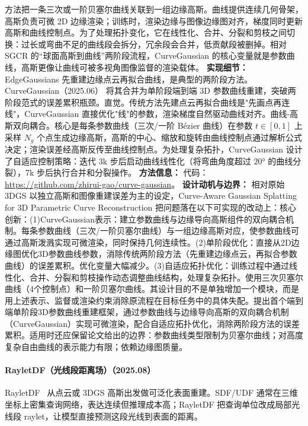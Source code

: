方法把一条三次或一阶贝塞尔曲线关联到一组边缘高斯。曲线提供连续几何骨架，高斯负责可微 2D 边缘渲染；训练时，渲染边缘与图像边缘图对齐，梯度同时更新高斯和曲线控制点。为了处理拓扑变化，它在线性化、合并、分裂和剪枝之间切换：过长或弯曲不足的曲线段会拆分，冗余段会合并，低贡献段被删掉。相对 SGCR 的“球面高斯到曲线”两阶段流程，CurveGaussian 的核心变量就是参数曲线，高斯更像让曲线可被多视角图像监督的渲染载体。
\textbf{实现细节：} EdgeGaussians 先重建边缘点云再拟合曲线，是典型的两阶段方法。CurveGaussian（2025.06） 将其合并为单阶段端到端 3D 参数曲线重建，突破两阶段范式的误差累积瓶颈。直觉。传统方法先建点云再拟合曲线是"先画点再连线"，CurveGaussian 直接优化"线"的参数，渲染梯度自然驱动曲线对齐。曲线-高斯双向耦合。核心是每条参数曲线（三次/一阶 B\'{e}zier 曲线）在参数 $t \in [0,1]$ 上采样 $N_g$ 个点生成边缘高斯，高斯的中心、缩放和旋转由曲线控制点通过解析公式决定；渲染误差经高斯反传至曲线控制点。为处理复杂拓扑，CurveGaussian 设计了自适应控制策略：迭代 3k 步后启动曲线线性化（将弯曲角度超过 $20°$ 的曲线分裂），7k 步后执行合并和分裂操作。
\textbf{方法信息：} 代码：\url{https://github.com/zhirui-gao/curve-gaussian}。
\textbf{设计动机与边界：} 相对原始 3DGS 以独立高斯和图像重建误差为主的设定，Curve-Aware Gaussian Splatting for 3D Parametric Curve Reconstruction 把问题落在以下可实现的改动上：核心创新：(1)CurveGaussian表示：建立参数曲线与边缘导向高斯组件的双向耦合机制。每条参数曲线（三次/一阶贝塞尔曲线）与一组边缘高斯对应，使参数曲线可通过高斯泼溅实现可微渲染，同时保持几何连续性。(2)单阶段优化：直接从2D边缘图优化3D参数曲线参数，消除传统两阶段方法（先重建边缘点云，再拟合参数曲线）的误差累积。优化变量大幅减少。(3)自适应拓扑优化：训练过程中通过线性化、合并、分裂和剪枝操作动态调整曲线结构，处理复杂拓扑。使用三次贝塞尔曲线（4个控制点）和一阶贝塞尔曲线。其设计目的不是单独增加一个模块，而是用上述表示、监督或渲染约束消除原流程在目标任务中的具体失配。提出首个端到端单阶段3D参数曲线重建框架，通过参数曲线与边缘导向高斯的双向耦合机制（CurveGaussian）实现可微渲染，配合自适应拓扑优化，消除两阶段方法的误差累积。适用时还应保留论文给出的边界：参数曲线类型限制为贝塞尔曲线；对高度复杂自由曲线的表示能力有限；依赖边缘图质量。
\paragraph{RayletDF（光线段距离场）（2025.08）}
RayletDF~\cite{2508_09830} 从点云或 3DGS 高斯出发做可泛化表面重建。SDF/UDF 通常在三维坐标上密集查询网络，表达连续但推理成本高；RayletDF 把查询单位改成局部光线段 raylet，让模型直接预测这段光线到表面的距离。

